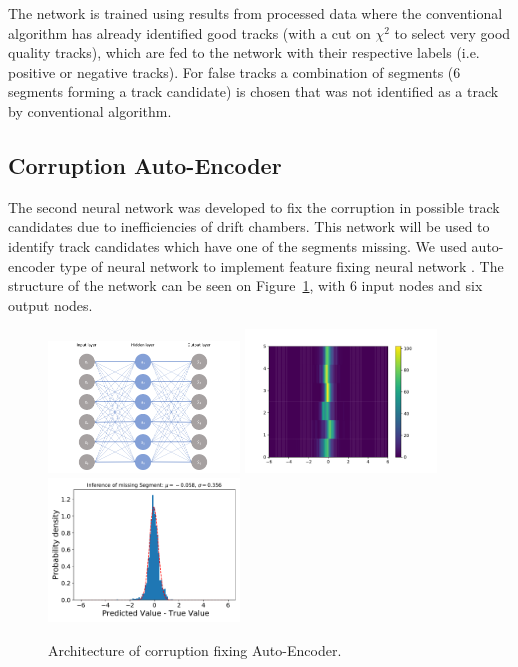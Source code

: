 The network is trained using results from processed data where the conventional algorithm has already 
identified good tracks (with a cut on $\chi^2$ to select very good quality tracks), which are fed to the network with
their respective labels (i.e. positive or negative tracks). For false tracks a combination of segments (6 segments 
forming a track candidate) is chosen that was not identified as a track by conventional algorithm.
 
 \subsection{Corruption Auto-Encoder}
 
The second neural network was developed to fix the corruption in possible track candidates due to 
inefficiencies of drift chambers. This network will be used to identify track candidates which have one of the segments
missing. We used auto-encoder type of neural network to implement feature fixing neural network \cite{Gavalian:2020xmc}. 
The structure of the network can be seen on Figure~\ref{autoencoder:architecture}, with 6 input nodes and six output nodes.

 \begin{figure}[!ht]
\begin{center}
 \includegraphics[width=2.0in]{images/auto_encoder.png}
\includegraphics[width=2.0in]{images/auto_encoder_result_2d.pdf}
\includegraphics[width=2.0in]{images/auto_encoder_result_1d.pdf}
\caption {Architecture of corruption fixing Auto-Encoder.}
 \label{autoencoder:architecture}
 \end{center}
\end{figure}

